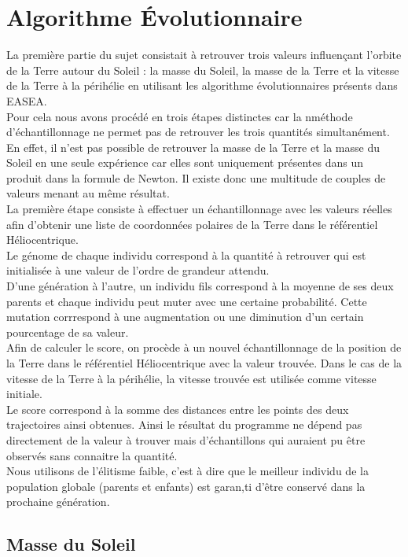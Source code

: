 \section{Algorithme \'Evolutionnaire}

La première partie du sujet consistait à retrouver trois valeurs influençant l'orbite de la Terre autour du Soleil : la masse du Soleil, la masse de la Terre et la vitesse de la Terre à la périhélie en utilisant les algorithme évolutionnaires présents dans EASEA.\\
Pour cela nous avons procédé en trois étapes distinctes car la nméthode d'échantillonnage ne permet pas de retrouver les trois quantités simultanément. En effet, il n'est pas possible de retrouver la masse de la Terre et la masse du Soleil en une seule expérience car elles sont uniquement présentes dans un produit dans la formule de Newton. Il existe donc une multitude de couples de valeurs menant au même résultat.\\
La première étape consiste à effectuer un échantillonnage avec les valeurs réelles afin d'obtenir une liste de coordonnées polaires de la Terre dans le référentiel Héliocentrique.\\
Le génome de chaque individu correspond à la quantité à retrouver qui est initialisée à une valeur de l'ordre de grandeur attendu.\\
D'une génération à l'autre, un individu fils correspond à la moyenne de ses deux parents et chaque individu peut muter avec une certaine probabilité. Cette mutation corrrespond à une augmentation ou une diminution d'un certain pourcentage de sa valeur.\\
Afin de calculer le score, on procède à un nouvel échantillonnage de la position de la Terre dans le référentiel Héliocentrique avec la valeur trouvée. Dans le cas de la vitesse de la Terre à la périhélie, la vitesse trouvée est utilisée comme vitesse initiale.\\
Le score correspond à la somme des distances entre les points des deux trajectoires ainsi obtenues. Ainsi le résultat du programme ne dépend pas directement de la valeur à trouver mais d'échantillons qui auraient pu être observés sans connaitre la quantité.\\
Nous utilisons de l'élitisme faible, c'est à dire que le meilleur individu de la population globale (parents et enfants) est garan,ti d'être conservé dans la prochaine génération.

\subsection{Masse du Soleil}

